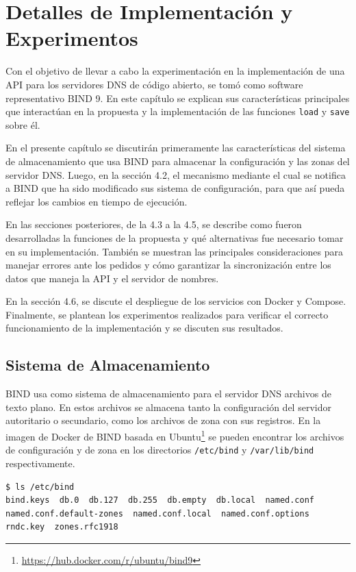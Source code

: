 \chapter{Detalles de Implementación y Experimentos}\label{chapter:implementation}

Con el objetivo de llevar a cabo la experimentación en la implementación de una API para los servidores DNS de código abierto, se tomó como software representativo BIND 9. En este capítulo se explican sus características principales que interactúan en la propuesta y la implementación de las funciones \verb|load| y \verb|save| sobre él.

En el presente capítulo se discutirán primeramente las características del sistema de almacenamiento que usa BIND para almacenar la configuración y las zonas del servidor DNS. Luego, en la sección 4.2, el mecanismo mediante el cual se notifica a BIND que ha sido modificado sus sistema de configuración, para que así pueda reflejar los cambios en tiempo de ejecución.

En las secciones posteriores, de la 4.3 a la 4.5, se describe como fueron desarrolladas la funciones de la propuesta y qué alternativas fue necesario tomar en su implementación. También se muestran las principales consideraciones para manejar errores ante los pedidos y cómo garantizar la sincronización entre los datos que maneja la API y el servidor de nombres.

En la sección 4.6, se discute el despliegue de los servicios con Docker y Compose. Finalmente, se plantean los experimentos realizados para verificar el correcto funcionamiento de la implementación y se discuten sus resultados.

\section{Sistema de Almacenamiento}\label{sec:bind-storage}
BIND usa como sistema de almacenamiento para el servidor DNS archivos de texto plano. En estos archivos se almacena tanto la configuración del servidor autoritario o secundario, como los archivos de zona con sus registros. En la imagen de Docker de BIND basada en Ubuntu\footnote{\url{https://hub.docker.com/r/ubuntu/bind9}} se pueden encontrar los archivos de configuración y de zona en los directorios \verb+/etc/bind+ y \verb+/var/lib/bind+ respectivamente.

\begin{lstlisting}[frame=single, numbers=none, caption=Contenido del directorio \textbf{/etc/bind}.]
$ ls /etc/bind
bind.keys  db.0  db.127  db.255  db.empty  db.local  named.conf
named.conf.default-zones  named.conf.local  named.conf.options
rndc.key  zones.rfc1918
\end{lstlisting}

